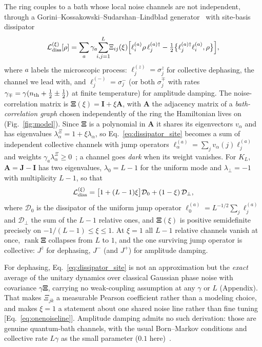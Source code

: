 \documentclass[aps,prl,reprint,amsmath,amssymb,floatfix]{revtex4-2}
\begin{document}
The ring couples to a bath whose local noise channels are not independent,
through a Gorini--Kossakowski--Sudarshan--Lindblad
generator~\cite{Lindblad1976,Gorini1976,Breuer2007} with site-basis dissipator
\begin{equation}
\label{eq:dissipator_site}
\mathcal L^{(\xi)}_{\rm diss}[\rho]=\sum_a\gamma_a\!\!\sum_{i,j=1}^{L}\!\!
\Xi_{ij}(\xi)\Bigl[\ell^{(a)}_i\rho\,\ell^{(a)\dagger}_j
-\tfrac12\bigl\{\ell^{(a)\dagger}_j\ell^{(a)}_i,\rho\bigr\}\Bigr],
\end{equation}
where $a$ labels the microscopic process: $\ell^{(z)}_j=\sigma^z_j$ for
collective dephasing, the channel we lead with, and
$\ell^{(-)}_j=\sigma^-_j$ (or both $\sigma^\mp_j$ with rates
$\gamma_\mp=\gamma(n_{\rm th}+\tfrac12\pm\tfrac12)$ at finite temperature) for
amplitude damping. The noise-correlation matrix is
$\bm\Xi(\xi)=\mathbf I+\xi\mathbf A$, with $\mathbf A$ the adjacency matrix of
a \emph{bath-correlation graph} chosen independently of the ring the
Hamiltonian lives on (Fig.~\ref{fig:model}). Since $\bm\Xi$ is a polynomial in
$\mathbf A$ it shares its eigenvectors $v_\alpha$ and has eigenvalues
$\lambda^\Xi_\alpha=1+\xi\lambda_\alpha$, so
Eq.~\eqref{eq:dissipator_site} becomes a sum of independent collective channels
with jump operators $\ell^{(a)}_\alpha=\sum_jv_\alpha(j)\ell^{(a)}_j$ and
weights $\gamma_a\lambda^\Xi_\alpha\ge0$~\cite{SM}; a channel goes \emph{dark}
when its weight vanishes. For $K_L$, $\mathbf A=\mathbf J-\mathbf I$ has two
eigenvalues, $\lambda_0=L-1$ for the uniform mode and $\lambda_\perp=-1$ with
multiplicity $L-1$, so that
\begin{equation}
\label{eq:complete_graph_split}
\mathcal L^{(\xi)}_{\rm diss}=\bigl[1+(L-1)\xi\bigr]\mathcal D_0
+(1-\xi)\,\mathcal D_\perp ,
\end{equation}
where $\mathcal D_0$ is the dissipator of the uniform jump operator
$\ell^{(a)}_0=L^{-1/2}\sum_j\ell^{(a)}_j$ and $\mathcal D_\perp$ the sum of the
$L-1$ relative ones, and $\bm\Xi(\xi)$ is positive semidefinite precisely on
$-1/(L-1)\le\xi\le1$. At $\xi=1$ all $L-1$ relative channels vanish at once,
$\operatorname{rank}\bm\Xi$ collapses from $L$ to $1$, and the one surviving
jump operator is collective: $J^z$ for dephasing, $J^-$ (and $J^+$) for
amplitude damping.

For dephasing, Eq.~\eqref{eq:dissipator_site} is not an approximation but the
\emph{exact} average of the unitary dynamics over classical Gaussian phase
noise with covariance $\gamma\bm\Xi$, carrying no weak-coupling assumption at
any $\gamma$ or $L$ (Appendix). That makes $\Xi_{jk}$ a measurable Pearson
coefficient rather than a modeling choice, and makes $\xi=1$ a statement about
one shared noise line rather than fine tuning [Eq.~\eqref{eq:onenoiseline}].
Amplitude damping admits no such derivation: those are genuine quantum-bath
channels, with the usual Born--Markov conditions and collective rate $L\gamma$
as the small parameter ($0.1$ here)~\cite{SM}.
\end{document}
